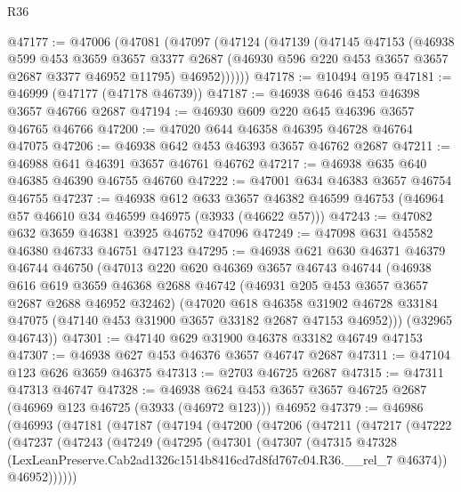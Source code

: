 \begin{lexlean}{R36}
\begin{coremodule}
@47177 := @47006
    (@47081
      (@47097
        (@47124
          (@47139
            (@47145
              @47153
              (@46938
                @599
                @453
                @3659
                @3657
                @3377
                @2687
                (@46930 @596 @220 @453 @3657 @3657 @2687 @3377 @46952 @11795)
                @46952))))))
@47178 := @10494 @195
@47181 := @46999 (@47177 (@47178 @46739))
@47187 := @46938 @646 @453 @46398 @3657 @46766 @2687
@47194 := @46930 @609 @220 @645 @46396 @3657 @46765 @46766
@47200 := @47020 @644 @46358 @46395 @46728 @46764 @47075
@47206 := @46938 @642 @453 @46393 @3657 @46762 @2687
@47211 := @46988 @641 @46391 @3657 @46761 @46762
@47217 := @46938 @635 @640 @46385 @46390 @46755 @46760
@47222 := @47001 @634 @46383 @3657 @46754 @46755
@47237 := @46938
    @612
    @633
    @3657
    @46382
    @46599
    @46753
    (@46964 @57 @46610 @34 @46599 @46975 (@3933 (@46622 @57)))
@47243 := @47082 @632 @3659 @46381 @3925 @46752 @47096
@47249 := @47098 @631 @45582 @46380 @46733 @46751 @47123
@47295 := @46938
    @621
    @630
    @46371
    @46379
    @46744
    @46750
    (@47013
      @220
      @620
      @46369
      @3657
      @46743
      @46744
      (@46938
        @616
        @619
        @3659
        @46368
        @2688
        @46742
        (@46931 @205 @453 @3657 @3657 @2687 @2688 @46952 @32462)
        (@47020
          @618
          @46358
          @31902
          @46728
          @33184
          @47075
          (@47140 @453 @31900 @3657 @33182 @2687 @47153 @46952)))
      (@32965 @46743))
@47301 := @47140 @629 @31900 @46378 @33182 @46749 @47153
@47307 := @46938 @627 @453 @46376 @3657 @46747 @2687
@47311 := @47104 @123 @626 @3659 @46375
@47313 := @2703 @46725 @2687
@47315 := @47311 @47313 @46747
@47328 := @46938
    @624
    @453
    @3657
    @3657
    @46725
    @2687
    (@46969 @123 @46725 (@3933 (@46972 @123)))
    @46952
@47379 := @46986
    (@46993
      (@47181
        (@47187
          (@47194
            (@47200
              (@47206
                (@47211
                  (@47217
                    (@47222
                      (@47237
                        (@47243
                          (@47249
                            (@47295
                              (@47301
                                (@47307
                                  (@47315
                                    @47328
                                    (LexLeanPreserve.Cab2ad1326c1514b8416cd7d8fd767c04.R36.__rel_7
                                      @46374))
                                  @46952))))))

\end{coremodule}
\end{lexlean}
